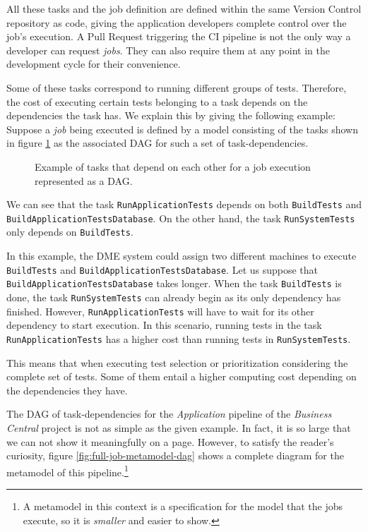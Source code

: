 All these tasks and the job definition are defined within the same
Version Control repository as code, giving the application developers complete 
control over the job's execution. A Pull Request triggering the CI pipeline is not the only way 
a developer can request \emph{jobs}. They can also require them at any point in the development 
cycle for their convenience.

Some of these tasks correspond to running different groups of tests. Therefore, the cost of executing 
certain tests belonging to a task depends on the dependencies the task has.
We explain this by giving the following example: Suppose a \emph{job} being executed 
is defined by a model consisting of the tasks shown in figure \ref{fig:example-dag-tasks} as the 
associated DAG for such a set of task-dependencies. 

\begin{figure}
    \def\svgwidth{\columnwidth}
    
    \caption{Example of tasks that depend on each other for a job execution represented as a DAG.}
    \label{fig:example-dag-tasks}
\end{figure}

We can see that the task \texttt{RunApplicationTests} depends on both \texttt{BuildTests}
and \texttt{BuildApplicationTestsDatabase}. On the other hand, the task 
\texttt{RunSystemTests} only depends on \texttt{BuildTests}.

In this example, the DME system could assign two different machines to execute 
\texttt{BuildTests} and \texttt{BuildApplicationTestsDatabase}. Let us suppose that\\
\texttt{BuildApplicationTestsDatabase} takes longer. When the task \texttt{BuildTests}
is done, the task \texttt{RunSystemTests} can already begin as its only dependency
has finished. However, \texttt{RunApplicationTests} will have to wait for its other
dependency to start execution. In this scenario, running tests in the task \texttt{RunApplicationTests}
has a higher cost than running tests in \texttt{RunSystemTests}.

This means that when executing test selection or prioritization considering the complete
set of tests. Some of them entail a higher computing cost depending on the dependencies they
have.

The DAG of task-dependencies for the \emph{Application} pipeline of the \emph{Business Central} project is not as simple 
as the given example. In fact, it is so large that we can not show it meaningfully on a
page. However, to satisfy the reader's curiosity, figure \ref{fig:full-job-metamodel-dag} 
shows a complete diagram for the metamodel of this pipeline.\footnote{A 
metamodel in this context is a specification for the model that the jobs execute, so it is \textit{smaller} and easier to show.}


